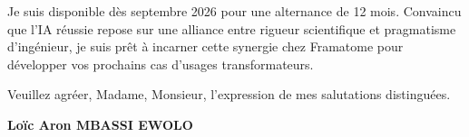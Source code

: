 \documentclass[a4paper,11pt]{article}
\begin{document}
\vspace{0.8em}
Je suis disponible dès septembre 2026 pour une alternance de 12 mois. Convaincu que l'IA réussie repose sur une alliance entre rigueur scientifique et pragmatisme d'ingénieur, je suis prêt à incarner cette synergie chez Framatome pour développer vos prochains cas d'usages transformateurs.

\vspace{1.5em}
\noindent Veuillez agréer, Madame, Monsieur, l'expression de mes salutations distinguées.

\vspace{2em}
\noindent \textbf{Loïc Aron MBASSI EWOLO}
\end{document}
